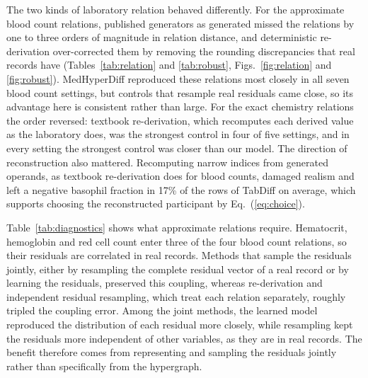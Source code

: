 \documentclass[pdflatex,referee]{sn-jnl}%
\begin{document}
The two kinds of laboratory relation behaved differently. For the approximate blood count relations, published generators as generated missed the relations by one to three orders of magnitude in relation distance, and deterministic re-derivation over-corrected them by removing the rounding discrepancies that real records have (Tables~\ref{tab:relation} and \ref{tab:robust}, Figs.~\ref{fig:relation} and \ref{fig:robust}). MedHyperDiff reproduced these relations most closely in all seven blood count settings, but controls that resample real residuals came close, so its advantage here is consistent rather than large. For the exact chemistry relations the order reversed: textbook re-derivation, which recomputes each derived value as the laboratory does, was the strongest control in four of five settings, and in every setting the strongest control was closer than our model. The direction of reconstruction also mattered. Recomputing narrow indices from generated operands, as textbook re-derivation does for blood counts, damaged realism and left a negative basophil fraction in 17\% of the rows of TabDiff on average, which supports choosing the reconstructed participant by Eq.~(\ref{eq:choice}).

Table~\ref{tab:diagnostics} shows what approximate relations require. Hematocrit, hemoglobin and red cell count enter three of the four blood count relations, so their residuals are correlated in real records. Methods that sample the residuals jointly, either by resampling the complete residual vector of a real record or by learning the residuals, preserved this coupling, whereas re-derivation and independent residual resampling, which treat each relation separately, roughly tripled the coupling error. Among the joint methods, the learned model reproduced the distribution of each residual more closely, while resampling kept the residuals more independent of other variables, as they are in real records. The benefit therefore comes from representing and sampling the residuals jointly rather than specifically from the hypergraph.
\end{document}
